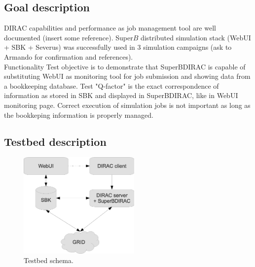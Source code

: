 \documentclass[a4paper]{jpconf}
\begin{document}
\subsection{Goal description}
DIRAC capabilities and performance as job management tool are well documented (insert some reference). Super$B$ distributed simulation stack (WebUI + SBK + Severus) was successfully used in 3 simulation campaigns (ask to Armando for confirmation and references).\\
Functionality Test objective is to demonstrate that SuperBDIRAC is capable of substituting WebUI as monitoring tool for job submission and showing data from a bookkeeping database. Test "Q-factor" is the exact correspondence of information as stored in SBK and displayed in SuperBDIRAC, like in WebUI monitoring page. Correct execution of simulation jobs is not important as long as the bookkeping information is properly managed.

\subsection{Testbed description}

\begin{figure}[h]
\includegraphics[width=14pc]{img/testbed.eps}\hspace{2pc}%
\begin{minipage}[b]{14pc}\caption{\label{label}Testbed schema.}
\end{minipage}
\end{figure}
\end{document}
